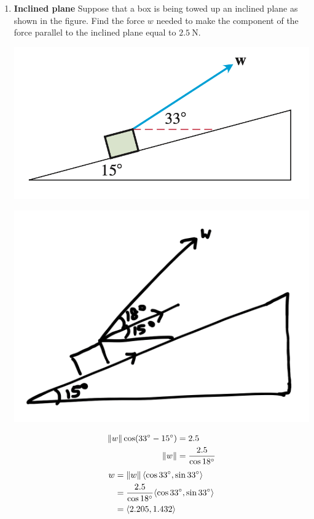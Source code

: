 \begin{enumerate}
    \item \textbf{Inclined plane} Suppose that a box is being towed up an inclined plane as shown in the figure. Find the force $w$ needed to make the component of the force parallel to the inclined plane equal to $2.5 \mathrm{~N}$.
          \begin{center}
              \includegraphics[scale=0.5]{assets/thomas12.3q26.png}
          \end{center}
          \sol{}
          \begin{center}
              \includegraphics[scale=0.4]{assets/thomas12.3q26sol.png}
          \end{center}
          \begin{align*}
              \left\lVert w\right\rVert \cos (33^{\circ} - 15^{\circ}) & = 2.5                          \\
              \left\lVert w\right\rVert                                & = \dfrac{2.5}{\cos 18^{\circ}}
          \end{align*}
          \begin{align*}
              w & = \left\lVert w\right\rVert \langle \cos 33^{\circ}, \sin 33^{\circ} \rangle                    \\
                & =\dfrac{2.5}{\cos 18^{\circ}} \langle \cos 33^{\circ}, \sin 33^{\circ} \rangle \\
                & = \langle 2.205, 1.432 \rangle                                                 \\
          \end{align*}


\end{enumerate}
